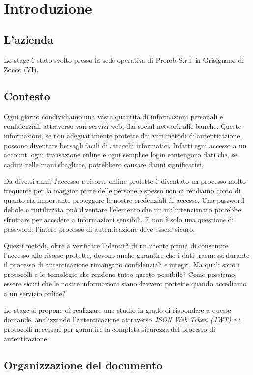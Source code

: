 \chapter{Introduzione}
\label{cap:introduzione}


\section{L'azienda}

Lo stage è stato svolto presso la sede operativa di Prorob S.r.l. in Grisignano di Zocco (VI).


\section{Contesto}

Ogni giorno condividiamo una vasta quantità di informazioni personali e confidenziali attraverso vari servizi web, dai social network alle banche.
Queste informazioni, se non adeguatamente protette dai vari metodi di autenticazione, possono diventare bersagli facili di attacchi informatici.
Infatti ogni accesso a un account, ogni transazione online e ogni semplice login contengono dati che, se caduti nelle mani sbagliate, potrebbero causare danni significativi.

Da diversi anni, l'accesso a risorse online protette è diventato un processo molto frequente per la maggior parte delle persone e spesso non ci rendiamo conto di quanto sia importante proteggere le nostre credenziali di accesso.
Una password debole o riutilizzata può diventare l'elemento che un malintenzionato potrebbe sfruttare per accedere a informazioni sensibili.
E non è solo una questione di password: l'intero processo di autenticazione deve essere sicuro.

Questi metodi, oltre a verificare l'identità di un utente prima di consentire l'accesso alle risorse protette, devono anche garantire che i dati trasmessi durante il processo di autenticazione rimangano confidenziali e integri.
Ma quali sono i protocolli e le tecnologie che rendono tutto questo possibile? Come possiamo essere sicuri che le nostre informazioni siano davvero protette quando accediamo a un servizio online?

Lo stage si propone di realizzare uno studio in grado di rispondere a queste domande, analizzando l'autenticazione attraverso \emph{JSON Web Token (JWT)} e i protocolli necessari per garantire la completa sicurezza del processo di autenticazione.


\section{Organizzazione del documento}

